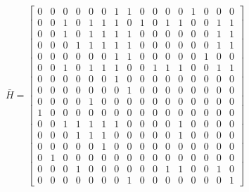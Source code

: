 \documentclass[12pt, a4paper]{report}
\begin{document}
\begin{appendices}
\begin{equation}
\label{mat:Logical H}
\bar{H}=
    \begin{bmatrix}
    0 & 0 & 0 & 0 & 0 & 0 & 1 & 1 & 0 & 0 & 0 & 0 & 1 & 0 & 0 & 0 \\
    0 & 0 & 1 & 0 & 1 & 1 & 1 & 0 & 1 & 0 & 1 & 1 & 0 & 0 & 1 & 1 \\
    0 & 0 & 1 & 0 & 1 & 1 & 1 & 1 & 0 & 0 & 0 & 0 & 0 & 0 & 1 & 1 \\
    0 & 0 & 0 & 1 & 1 & 1 & 1 & 1 & 0 & 0 & 0 & 0 & 0 & 0 & 1 & 1 \\
    0 & 0 & 0 & 0 & 0 & 0 & 1 & 1 & 0 & 0 & 0 & 0 & 0 & 1 & 0 & 0 \\
    0 & 0 & 1 & 0 & 1 & 1 & 1 & 0 & 0 & 1 & 1 & 1 & 0 & 0 & 1 & 1 \\
    0 & 0 & 0 & 0 & 0 & 0 & 1 & 0 & 0 & 0 & 0 & 0 & 0 & 0 & 0 & 0 \\
    0 & 0 & 0 & 0 & 0 & 0 & 0 & 1 & 0 & 0 & 0 & 0 & 0 & 0 & 0 & 0 \\
    0 & 0 & 0 & 0 & 1 & 0 & 0 & 0 & 0 & 0 & 0 & 0 & 0 & 0 & 0 & 0 \\
    1 & 0 & 0 & 0 & 0 & 0 & 0 & 0 & 0 & 0 & 0 & 0 & 0 & 0 & 0 & 0 \\
    0 & 0 & 1 & 1 & 1 & 1 & 1 & 0 & 0 & 0 & 0 & 1 & 0 & 0 & 0 & 0 \\
    0 & 0 & 0 & 1 & 1 & 1 & 0 & 0 & 0 & 0 & 0 & 1 & 0 & 0 & 0 & 0 \\
    0 & 0 & 0 & 0 & 0 & 1 & 0 & 0 & 0 & 0 & 0 & 0 & 0 & 0 & 0 & 0 \\
    0 & 1 & 0 & 0 & 0 & 0 & 0 & 0 & 0 & 0 & 0 & 0 & 0 & 0 & 0 & 0 \\
    0 & 0 & 0 & 1 & 0 & 0 & 0 & 0 & 0 & 0 & 1 & 1 & 0 & 0 & 1 & 0 \\
    0 & 0 & 0 & 0 & 0 & 0 & 0 & 1 & 0 & 0 & 0 & 0 & 0 & 0 & 0 & 1
    \end{bmatrix}
\end{equation}


\end{appendices}
\end{document}
